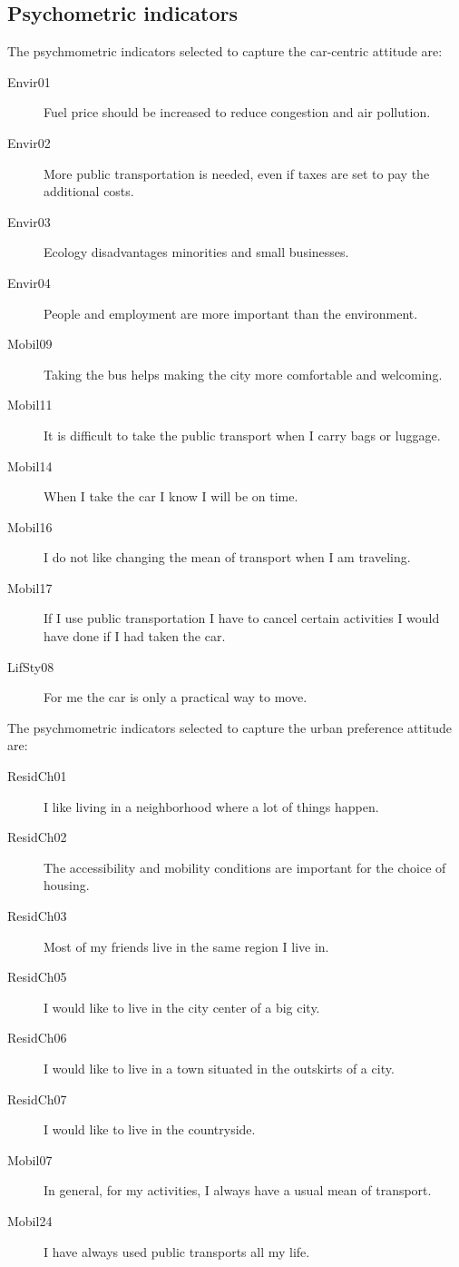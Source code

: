 \documentclass[12pt,a4paper]{article}
\begin{document}
\subsection{Psychometric indicators}
\label{sec:psycho}
The psychmometric indicators selected to capture the car-centric attitude are:
\begin{description}
\item[Envir01]  Fuel price should be increased to reduce congestion and air pollution.
\item[Envir02]   More public transportation is needed, even if taxes are set to pay the additional costs.
\item[Envir03]  Ecology disadvantages minorities and small businesses.
\item[Envir04]  People and employment are more important than the environment.
\item[Mobil09]  Taking the bus helps making the city more comfortable and welcoming.
\item[Mobil11]  It is difficult to take the public transport when I carry bags or luggage. 
\item[Mobil14]  When I take the car I know I will be on time.
\item[Mobil16]  I do not like changing the mean of transport when I am traveling.
\item[Mobil17]  If I use public transportation I have to cancel certain activities I would have done if I had taken the car. 
\item[LifSty08] For me the car is only a practical way to move.
\end{description}
The psychmometric indicators selected to capture the urban preference attitude are:
\begin{description}
\item[ResidCh01] I like living in a neighborhood where a lot of things happen. 
\item[ResidCh02] The accessibility and mobility conditions are important for the choice of housing.
\item[ResidCh03] Most of my friends live in the same region I live in.
\item[ResidCh05] I would like to live in the city center of a big city.
\item[ResidCh06] I would like to live in a town situated in the outskirts of a city. 
\item[ResidCh07] I would like to live in the countryside.
\item[Mobil07] In general, for my activities, I always have a usual mean of transport.
\item[Mobil24] I have always used public transports all my life.
\end{description}
\end{document}
